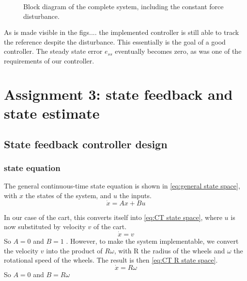 \documentclass[a4paper]{article}
\newcommand{\newpar}{\vspace{.3cm}\noindent}
\begin{document}
\begin{figure}[H]
    \caption{Block diagram of the complete system, including the constant force disturbance.}
    \label{fig:disturbance_BlockDiagram}
\end{figure}



\newpar
As is made visible in the figs.... the implemented controller is still able to track the reference despite the disturbance. This essentially is the goal of a good controller. The steady state error $e_{ss}$ eventually becomes zero, as was one of the requirements of our controller.


\section{Assignment 3: state feedback and state estimate}
\subsection{State feedback controller design}
\subsubsection{state equation}

The general continuous-time state equation is shown in \autoref{eq:general state space}, with $x$ the states of the system, and $u$ the inputs.
    \begin{equation}
        \dot{x} = Ax + Bu
        \label{eq:general state space}
    \end{equation}

\newar 
In our case of the cart, this converts itself into \autoref{eq:CT state space}, where $u$ is now substituted by velocity $v$ of the cart.
    \begin{equation}
        \dot{x} =  v
        \label{eq:CT state space}
    \end{equation}
\newar 
So $A=0$ and $B=1$ . However, to make the system implementable, we convert the velocity $v$ into the product of $R\omega$, with R the radius of the wheels and $\omega$ the rotational speed of the wheels. The result is then \autoref{eq:CT R state space}.
     \begin{equation}
        \dot{x} =  R\omega
        \label{eq:CT R state space}
    \end{equation}
\newar
So $A=0$ and $B=R\omega$
    
\end{document}
